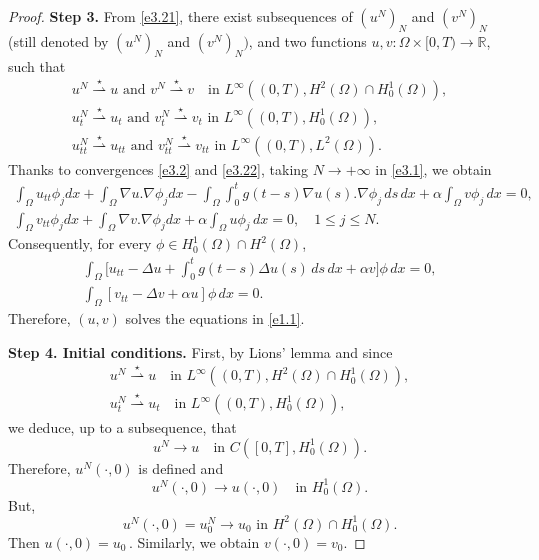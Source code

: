 \documentclass[10pt,a4paper]{amsart}
\numberwithin{equation}{section}
\begin{document}
\begin{proof}
\noindent\textbf{Step 3.}
From \eqref{e3.21}, there exist subsequences of $(u^{N})_{N}$ and $(v^{N})_{N}$
(still denoted by $(u^{N})_{N}$ and $(v^{N})_{N})$, and two functions
$u, v : \Omega \times [0, T) \to \mathbb{R}$, such that
\begin{equation}
\begin{gathered}
u^{N} \overset{\star}{\rightharpoonup} u \text{ and }
 v^{N} \overset{\star}{\rightharpoonup} v \quad \text{in }
 L^\infty((0,T), H^2(\Omega) \cap H_0^1 (\Omega)), \\
u_{t}^{N} \overset{\star}{\rightharpoonup} u_{t} \text{ and }
 v_{t}^{N} \overset{\star}{\rightharpoonup} v_{t} \text{ in } L^\infty((0,T),
 H^1_0(\Omega)), \\
 u_{tt}^{N} \overset{\star}{\rightharpoonup} u_{tt} \text{ and }
 v_{tt}^{N} \overset{\star}{\rightharpoonup} v_{tt} \text{ in }
 L^\infty((0,T), L^2(\Omega)).
\end{gathered}\label{e3.22}
\end{equation}
Thanks to convergences \eqref{e3.2} and \eqref{e3.22}, taking $N \to +\infty$
in \eqref{e3.1}, we obtain
\begin{equation}
\begin{gathered}
\int_\Omega u_{tt}\phi_j dx + \int_\Omega \nabla u .\nabla \phi_j dx
- \int_\Omega \int_0^t g(t-s) \nabla u(s) .\nabla \phi_j\, ds\, dx
+ \alpha \int_\Omega v \phi_j \, dx = 0,\\
\int_\Omega v_{tt} \phi_j dx + \int_\Omega \nabla v.\nabla \phi_j dx
+ \alpha \int_\Omega u \phi_j \, dx = 0,\quad 1\leq j\leq N.
\end{gathered} \label{e3.23}
\end{equation}
 Consequently, for every $ \phi \in H_0^1(\Omega)\cap H^2(\Omega)$,
\begin{gather*}
\int_\Omega \Big[ u_{tt}- \Delta u + \int_0^t g(t-s) \Delta u(s)\, ds\,dx
 + \alpha v\Big] \phi \, dx = 0,\\
\int_\Omega [ v_{tt} - \Delta v + \alpha u] \phi \, dx = 0.
\end{gather*}
Therefore, $(u,v)$ solves the equations in \eqref{e1.1}.
\smallskip

\noindent\textbf{Step 4. Initial conditions.}
First, by Lions' lemma \cite{Lions} and since
\begin{gather*}
u^{N} \overset{\star}{\rightharpoonup} u \quad \text{in }
 L^\infty((0,T), H^2(\Omega) \cap H_0^1 (\Omega)), \\
u_{t}^{N} \overset{\star}{\rightharpoonup} u_{t} \quad \text{in }
 L^\infty((0,T), H^1_0(\Omega)),
\end{gather*}
we deduce, up to a subsequence, that
\begin{equation}
u^{N} \to u \quad \text{in } C([0, T], H^1_0(\Omega)).\label{e3.24}
\end{equation}
Therefore, \( u^{N}(\cdot, 0) \) is defined and
\[
u^{N}(\cdot, 0) \to u(\cdot, 0) \quad \text{in } H^1_0(\Omega).
\]
But,
\[ u^{N}(\cdot, 0) = u^{N}_0 \to u_0 \,\, \text{in}\,\, H^2(\Omega) \cap H^1_0(\Omega).\] Then \( u(\cdot, 0) = u_0 \, \). Similarly, we obtain $v(\cdot, 0)=v_0. $


\end{proof}
\end{document}
